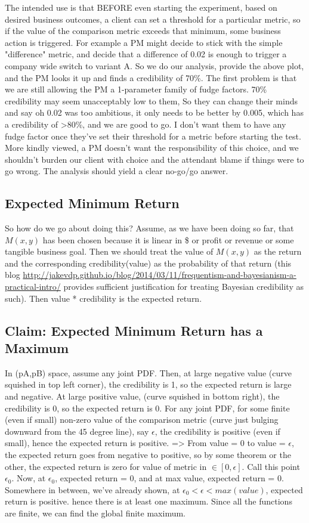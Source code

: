 \documentclass[letterpaper,12pt]{article}
\begin{document}
The intended use is that BEFORE even starting the experiment, based on
desired business outcomes, a client can set a threshold for a
particular metric, so if the value of the comparison metric exceeds
that minimum, some business action is triggered. For example a PM
might decide to stick with the simple "difference" metric, and decide
that a difference of 0.02 is enough to trigger a company wide switch
to variant A. So we do our analysis, provide the above plot, and the
PM looks it up and finds a credibility of 70\%.  The first problem is
that we are still allowing the PM a 1-parameter family of fudge
factors. 70\% credibility may seem unacceptably low to them, So they
can change their minds and say oh 0.02 was too ambitious, it only
needs to be better by 0.005, which has a credibility of >80\%, and we
are good to go. I don't want them to have any fudge factor once
they've set their threshold for a metric before starting the test.
More kindly viewed, a PM doesn't want the responsibility of this
choice, and we shouldn't burden our client with choice and the
attendant blame if things were to go wrong. The analysis should yield
a clear no-go/go answer.

\subsection{Expected Minimum Return}
So how do we go about doing this? Assume, as we have been doing so
far, that \(M(x,y)\) has been chosen because it is linear in \$ or profit
or revenue or some tangible business goal. Then we should treat the
value of \(M(x,y)\) as the return and the corresponding credibility(value)
as the probability of that return (this blog
\url{http://jakevdp.github.io/blog/2014/03/11/frequentism-and-bayesianism-a-practical-intro/}
provides sufficient justification for treating Bayesian credibility as
such). Then value * credibility is the expected return.

\subsection{Claim: Expected Minimum Return has a Maximum}\label{sec:exists_max}
In (pA,pB) space, assume any joint PDF.  Then, at large negative value
(curve squished in top left corner), the credibility is 1, so the
expected return is large and negative.  At large positive value,
(curve squished in bottom right), the credibility is 0, so the
expected return is 0.  For any joint PDF, for some finite (even if
small) non-zero value of the comparison metric (curve just bulging
downward from the 45 degree line), say \(\epsilon\), the credibility
is positive (even if small), hence the expected return is positive.
=> From value = 0 to value = \(\epsilon\), the expected return goes
from negative to positive, so by some theorem or the other, the
expected return is zero for value of metric in \(\in
[0,\epsilon]\). Call this point \(\epsilon_0\).  Now, at
\(\epsilon_0\), expected return = 0, and at max value, expected return
= 0. Somewhere in between, we've already shown, at \(\epsilon_0 <
\epsilon < max(value)\), expected return is positive. hence there is
at least one maximum. Since all the functions are finite, we can find
the global finite maximum.
\end{document}
